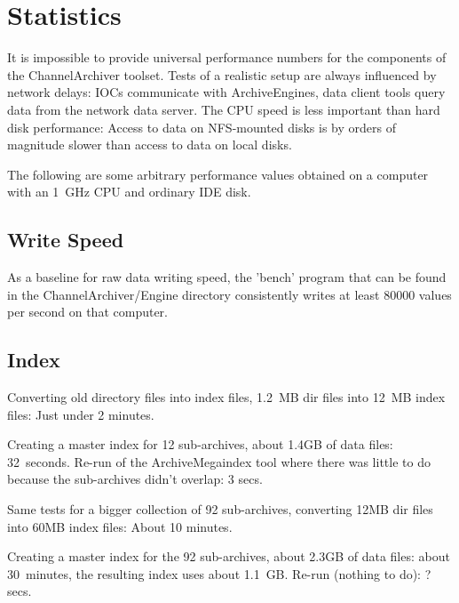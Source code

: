 \section{Statistics}
It is impossible to provide universal performance numbers for the
components of the ChannelArchiver toolset. Tests of a realistic setup
are always influenced by network delays: IOCs communicate with ArchiveEngines,
data client tools query data from the network data server.
The CPU speed is less important than hard disk performance:
Access to data on NFS-mounted disks is by orders of magnitude
slower than access to data on local disks.

The following are some arbitrary performance values obtained on a computer
with an 1~GHz CPU and ordinary IDE disk.
\subsection{Write Speed}
As a baseline for raw data writing speed, the 'bench' program that can
be found in the ChannelArchiver/Engine directory consistently writes
at least 80000 values per second on that computer.

\subsection{Index}
Converting old directory files into index files,
1.2~MB dir files into 12~MB index files: Just under 2 minutes.

Creating a master index for 12 sub-archives,
about 1.4GB of data files: 32~seconds.
Re-run of the ArchiveMegaindex tool where there was
little to do because the sub-archives didn't overlap: 3 secs.

Same tests for a bigger collection of 92 sub-archives,
converting 12MB dir files into 60MB index files: About 10 minutes.

Creating a master index for the 92 sub-archives,
about 2.3GB of data files: about 30~minutes, the resulting
index uses about 1.1~GB.
Re-run (nothing to do): ? secs.
